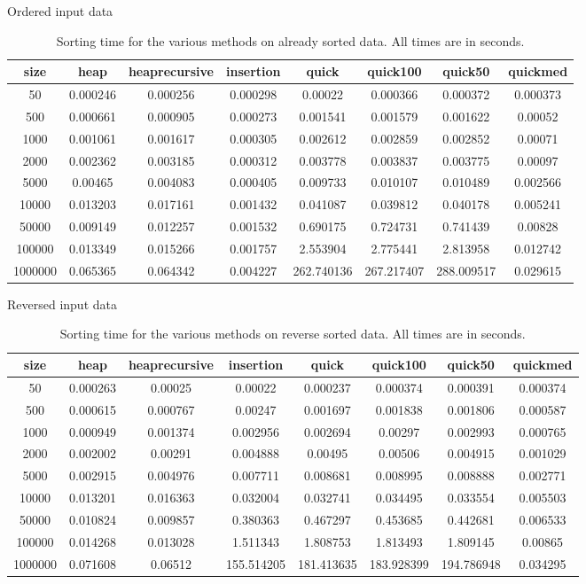 \documentclass[a4paper,12pt]{article}
\begin{document}
\begin{table}[h]
\caption {Ordered input data} 
\begin{tabular}{cccccccc}
size & heap & heaprecursive & insertion & quick & quick100 & quick50 & quickmed \\ \hline
50 & 0.000246 & 0.000256 & 0.000298 & 0.00022 & 0.000366 & 0.000372 & 0.000373 \\
500 & 0.000661 & 0.000905 & 0.000273 & 0.001541 & 0.001579 & 0.001622 & 0.00052 \\
1000 & 0.001061 & 0.001617 & 0.000305 & 0.002612 & 0.002859 & 0.002852 & 0.00071 \\
2000 & 0.002362 & 0.003185 & 0.000312 & 0.003778 & 0.003837 & 0.003775 & 0.00097 \\
5000 & 0.00465 & 0.004083 & 0.000405 & 0.009733 & 0.010107 & 0.010489 & 0.002566 \\
10000 & 0.013203 & 0.017161 & 0.001432 & 0.041087 & 0.039812 & 0.040178 & 0.005241 \\
50000 & 0.009149 & 0.012257 & 0.001532 & 0.690175 & 0.724731 & 0.741439 & 0.00828 \\
100000 & 0.013349 & 0.015266 & 0.001757 & 2.553904 & 2.775441 & 2.813958 & 0.012742 \\
1000000 & 0.065365 & 0.064342 & 0.004227 & 262.740136 & 267.217407 & 288.009517 & 0.029615 \\
\end{tabular}
\caption{Sorting time for the various methods on already sorted data.  All times are in seconds.}
\end{table}


\begin{table}[h]
\caption {Reversed input data} 
\begin{tabular}{cccccccc}
size & heap & heaprecursive & insertion & quick & quick100 & quick50 & quickmed \\ \hline
50 & 0.000263 & 0.00025 & 0.00022 & 0.000237 & 0.000374 & 0.000391 & 0.000374 \\
500 & 0.000615 & 0.000767 & 0.00247 & 0.001697 & 0.001838 & 0.001806 & 0.000587 \\
1000 & 0.000949 & 0.001374 & 0.002956 & 0.002694 & 0.00297 & 0.002993 & 0.000765 \\
2000 & 0.002002 & 0.00291 & 0.004888 & 0.00495 & 0.00506 & 0.004915 & 0.001029 \\
5000 & 0.002915 & 0.004976 & 0.007711 & 0.008681 & 0.008995 & 0.008888 & 0.002771 \\
10000 & 0.013201 & 0.016363 & 0.032004 & 0.032741 & 0.034495 & 0.033554 & 0.005503 \\
50000 & 0.010824 & 0.009857 & 0.380363 & 0.467297 & 0.453685 & 0.442681 & 0.006533 \\
100000 & 0.014268 & 0.013028 & 1.511343 & 1.808753 & 1.813493 & 1.809145 & 0.00865 \\
1000000 & 0.071608 & 0.06512 & 155.514205 & 181.413635 & 183.928399 & 194.786948 & 0.034295 \\
\end{tabular}
\caption{Sorting time for the various methods on reverse sorted data.  All times are in seconds.}
\end{table}
\end{document}
